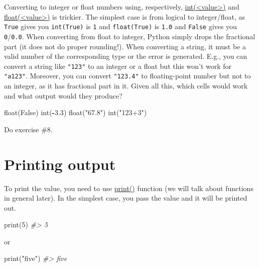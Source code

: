 \documentclass[
]{book}
\newenvironment{Shaded}{\begin{snugshade}}{\end{snugshade}}
\newcommand{\BuiltInTok}[1]{#1}
\newcommand{\CommentTok}[1]{\textcolor[rgb]{0.56,0.35,0.01}{\textit{#1}}}
\newcommand{\DecValTok}[1]{\textcolor[rgb]{0.00,0.00,0.81}{#1}}
\newcommand{\FloatTok}[1]{\textcolor[rgb]{0.00,0.00,0.81}{#1}}
\newcommand{\NormalTok}[1]{#1}
\newcommand{\OperatorTok}[1]{\textcolor[rgb]{0.81,0.36,0.00}{\textbf{#1}}}
\newcommand{\StringTok}[1]{\textcolor[rgb]{0.31,0.60,0.02}{#1}}
\newcommand{\VariableTok}[1]{\textcolor[rgb]{0.00,0.00,0.00}{#1}}
\begin{document}
Converting to integer or float numbers using, respectively, \href{https://docs.python.org/3/library/functions.html\#int}{int(\textless value\textgreater)} and \href{https://docs.python.org/3/library/functions.html\#float}{float(\textless value\textgreater)} is trickier. The simplest case is from logical to integer/float, as \texttt{True} gives you \texttt{int(True)} is \texttt{1} and \texttt{float(True)} is \texttt{1.0} and \texttt{False} gives you \texttt{0}/\texttt{0.0}. When converting from float to integer, Python simply drops the fractional part (it does not do proper rounding!). When converting a string, it must be a valid number of the corresponding type or the error is generated. E.g., you can convert a string like \texttt{"123"} to an integer or a float but this won't work for \texttt{"a123"}. Moreover, you can convert \texttt{"123.4"} to floating-point number but not to an integer, as it has fractional part in it. Given all this, which cells would work and what output would they produce?

\begin{Shaded}
\begin{Highlighting}[]
\BuiltInTok{float}\NormalTok{(}\VariableTok{False}\NormalTok{)}
\BuiltInTok{int}\NormalTok{(}\OperatorTok{{-}}\FloatTok{3.3}\NormalTok{)}
\BuiltInTok{float}\NormalTok{(}\StringTok{"67.8"}\NormalTok{)}
\BuiltInTok{int}\NormalTok{(}\StringTok{"123+3"}\NormalTok{)}
\end{Highlighting}
\end{Shaded}

Do exercise \#8.

\hypertarget{print}{%
\section{Printing output}\label{print}}

To print the value, you need to use \href{https://docs.python.org/3/library/functions.html\#print}{print()} function (we will talk about functions in general later). In the simplest case, you pass the value and it will be printed out.

\begin{Shaded}
\begin{Highlighting}[]
\BuiltInTok{print}\NormalTok{(}\DecValTok{5}\NormalTok{)}
\CommentTok{\#\textgreater{} 5}
\end{Highlighting}
\end{Shaded}

or

\begin{Shaded}
\begin{Highlighting}[]
\BuiltInTok{print}\NormalTok{(}\StringTok{"five"}\NormalTok{)}
\CommentTok{\#\textgreater{} five}
\end{Highlighting}
\end{Shaded}
\end{document}
